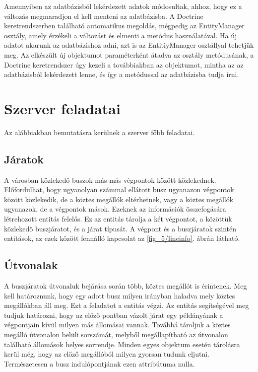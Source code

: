 Amennyiben az adatbázisból lekérdezett adatok módosultak, ahhoz, hogy ez a változás megmaradjon el kell menteni az adatbázisba. 
A Doctrine keretrendszerben található automatikus megoldás, mégpedig az EntityManager osztály, amely érzékeli a változást és elmenti a  metódus használatával. 
Ha új adatot akarunk az adatbázishoz adni, azt is az EntitiyManager osztállyal tehetjük meg. 
Az elkészült új objektumot paraméterként átadva az osztály  metódusának, a Doctrine keretrendszer úgy kezeli a továbbiakban az objektumot, mintha az az adatbázisból lekérdezett lenne, és így a  metódussal az adatbázisba tudja írni. 

\section{Szerver feladatai}
\label{serverjob}

Az alábbiakban bemutatásra kerülnek a szerver főbb feladatai.

\subsection*{Járatok}
\label{lineinfodetails}

A városban közlekedő buszok más-más végpontok között közlekednek. 
Előfordulhat, hogy ugyanolyan számmal ellátott busz ugyanazon végpontok között közlekedik, de a köztes megállók eltérhetnek, vagy a köztes megállók ugyanazok, de a végpontok mások. 
Ezeknek az információk összefogására létrehozott  entitás felelős. 
Ez az entitás tárolja a két végpontot, a közöttük közlekedő buszjáratot, és a járat típusát. 
A végpont és a buszjáratok szintén entitások, az ezek között fennálló kapcsolat az \ref{fig_5/lineinfo}. ábrán látható. 


\subsection*{Útvonalak}
\label{linehasstationsdetails}

A buszjáratok útvonaluk bejárása során több, köztes megállót is érintenek. 
Meg kell határoznunk, hogy egy adott busz milyen irányban haladva mely köztes megállókban áll meg. 
Ezt a feladatot a  entitás végzi. 
Az entitás segítségével meg tudjuk határozni, hogy az előző pontban vázolt járat egy példányának a végpontjain kívül milyen más állomásai vannak. 
Továbbá tároljuk a köztes megálló útvonalon belüli sorszámát, melyből megállapítható az útvonalon található állomások helyes sorrendje. 
Minden egyes objektum esetén tárolásra kerül még, hogy az előző megállóból milyen gyorsan tudunk eljutni. 
Természetesen a busz indulópontjának ezen attribútuma nulla. 

